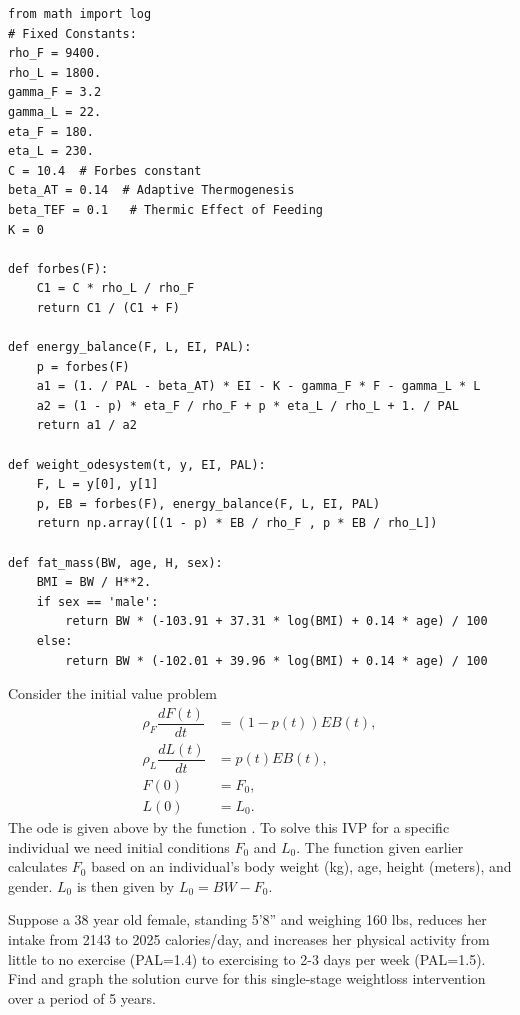 \begin{lstlisting}
from math import log
# Fixed Constants:
rho_F = 9400.
rho_L = 1800.
gamma_F = 3.2
gamma_L = 22.
eta_F = 180.
eta_L = 230.
C = 10.4  # Forbes constant
beta_AT = 0.14  # Adaptive Thermogenesis
beta_TEF = 0.1   # Thermic Effect of Feeding
K = 0

def forbes(F):
    C1 = C * rho_L / rho_F
    return C1 / (C1 + F)

def energy_balance(F, L, EI, PAL):
    p = forbes(F)
    a1 = (1. / PAL - beta_AT) * EI - K - gamma_F * F - gamma_L * L
    a2 = (1 - p) * eta_F / rho_F + p * eta_L / rho_L + 1. / PAL
    return a1 / a2

def weight_odesystem(t, y, EI, PAL):
    F, L = y[0], y[1]
    p, EB = forbes(F), energy_balance(F, L, EI, PAL)
    return np.array([(1 - p) * EB / rho_F , p * EB / rho_L])

def fat_mass(BW, age, H, sex):
    BMI = BW / H**2.
    if sex == 'male':
        return BW * (-103.91 + 37.31 * log(BMI) + 0.14 * age) / 100
    else:
        return BW * (-102.01 + 39.96 * log(BMI) + 0.14 * age) / 100

\end{lstlisting}

\begin{problem}
Consider the initial value problem
\begin{subequations}
\label{eqn:weight_prob1}
\begin{align*}
\rho_F \dfrac{dF(t)}{dt} &= (1-p(t)) EB(t),\\
\rho_L \dfrac{dL(t)}{dt} &= p(t) EB(t),\\
F(0) &= F_0, \\
L(0) &= L_0.
\end{align*}
\end{subequations}
The ode is given above by the function .
To solve this IVP for a specific individual we need initial conditions $F_0$ and $L_0.$
The function  given earlier calculates $F_0$ based on an individual's body weight (kg), age, height (meters), and gender.
$L_0$ is then given by $L_0 = BW - F_0$.

Suppose a 38 year old female, standing 5'8'' and weighing 160 lbs, reduces her intake from 2143 to 2025 calories/day, and increases her physical activity from little to no exercise (PAL=1.4) to exercising to 2-3 days per week (PAL=1.5).
Find and graph the solution curve for this single-stage weightloss intervention over a period of 5 years.
\end{problem}


